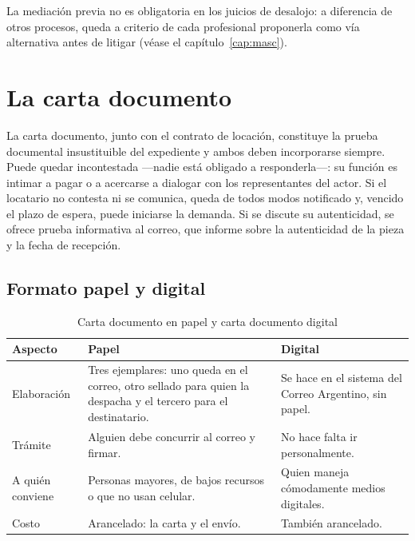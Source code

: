 \documentclass[12pt,oneside]{book}
\begin{document}
\begin{important}
La mediación previa no es obligatoria en los juicios de desalojo: a diferencia de otros procesos, queda a criterio de cada profesional proponerla como vía alternativa antes de litigar (véase el capítulo~\ref{cap:masc}).
\end{important}

\section{La carta documento}

La carta documento, junto con el contrato de locación, constituye la prueba documental insustituible del expediente y ambos deben incorporarse siempre. Puede quedar incontestada ---nadie está obligado a responderla---: su función es intimar a pagar o a acercarse a dialogar con los representantes del actor. Si el locatario no contesta ni se comunica, queda de todos modos notificado y, vencido el plazo de espera, puede iniciarse la demanda. Si se discute su autenticidad, se ofrece prueba informativa al correo, que informe sobre la autenticidad de la pieza y la fecha de recepción.

\subsection{Formato papel y digital}

\begin{table}[H]
\centering
\caption{Carta documento en papel y carta documento digital}
\begin{tabularx}{\textwidth}{>{\raggedright\arraybackslash}p{} >{\raggedright\arraybackslash}X >{\raggedright\arraybackslash}X}
\toprule
\textbf{Aspecto} & \textbf{Papel} & \textbf{Digital} \\
\midrule
Elaboración & Tres ejemplares: uno queda en el correo, otro sellado para quien la despacha y el tercero para el destinatario. & Se hace en el sistema del Correo Argentino, sin papel. \\
Trámite & Alguien debe concurrir al correo y firmar. & No hace falta ir personalmente. \\
A quién conviene & Personas mayores, de bajos recursos o que no usan celular. & Quien maneja cómodamente medios digitales. \\
Costo & Arancelado: la carta y el envío. & También arancelado. \\
\bottomrule
\end{tabularx}
\end{table}
\end{document}
